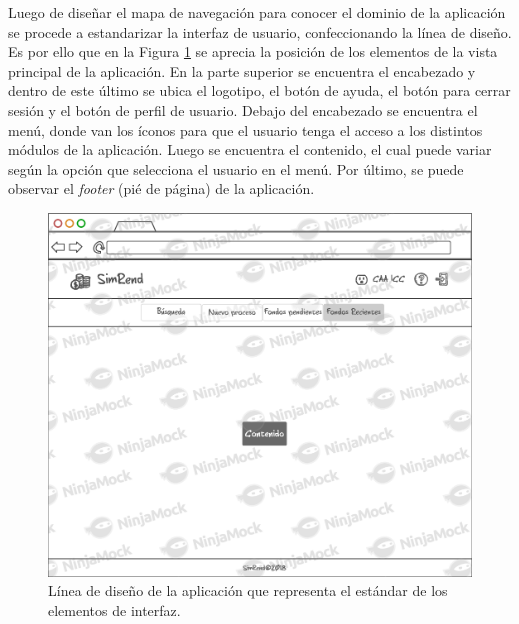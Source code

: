 Luego de diseñar el mapa de navegación para conocer el dominio de la aplicación se procede a estandarizar la interfaz de usuario, confeccionando la línea de diseño. Es por ello que en la Figura \ref{fig: Linea_disenio} se aprecia la posición de los elementos de la vista principal de la aplicación. En la parte superior se encuentra el encabezado y dentro de este último se ubica el logotipo, el botón de ayuda, el botón para cerrar sesión y el botón de perfil de usuario. Debajo del encabezado se encuentra el menú, donde van los íconos para que el usuario tenga el acceso a los distintos módulos de la aplicación. Luego se encuentra el contenido, el cual puede variar según la opción que selecciona el usuario en el menú. Por último, se puede observar el \emph{footer} (pié de página) de la aplicación.

\begin{figure}[h!tb]
    \includegraphics[width=\textwidth]{Imagenes/Linea_de_disenio.png}
    \caption{\label{fig: Linea_disenio}Línea de diseño de la aplicación que representa el estándar de los elementos de interfaz.}
\end{figure}